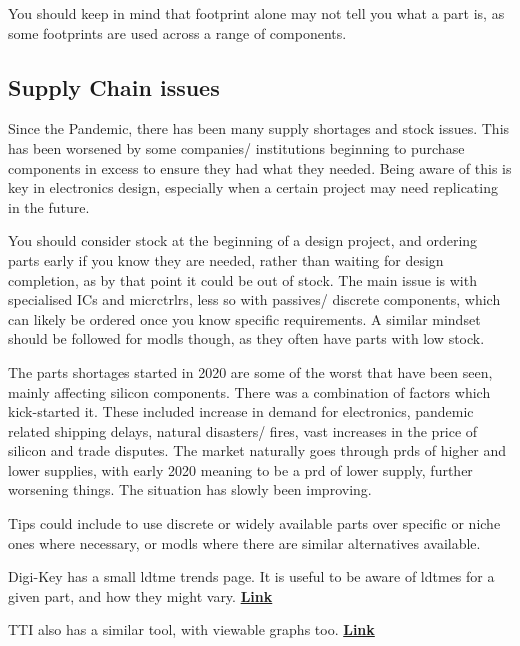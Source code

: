 \documentclass[a4paper,11pt]{report}
\let\oldhref\href %
\renewcommand{\href}[2]{\oldhref{#1}{\bfseries#2}}
\begin{document}
You should keep in mind that footprint alone may not tell you what a part is, as some footprints are used across a range of components.

\vspace*{1\baselineskip}

\subsection{Supply Chain issues}

Since the Pandemic, there has been many supply shortages and stock issues. This has been worsened by some companies/ institutions beginning to purchase components in excess to ensure they had what they needed. Being aware of this is key in electronics design, especially when a certain project may need replicating in the future.

You should consider stock at the beginning of a design project, and ordering parts early if you know they are needed, rather than waiting for design completion, as by that point it could be out of stock. The main issue is with specialised ICs and \gls{micrctrlr}s, less so with passives/ discrete components, which can likely be ordered once you know specific requirements. A similar mindset should be followed for \gls{modl}s though, as they often have parts with low stock.

The parts shortages started in 2020 are some of the worst that have been seen, mainly affecting silicon components. There was a combination of factors which kick-started it. These included increase in demand for electronics, pandemic related shipping delays, natural disasters/ fires, vast increases in the price of silicon and trade disputes. The market naturally goes through \gls{prd}s of higher and lower supplies, with early 2020 meaning to be a \gls{prd} of lower supply, further worsening things. The situation has slowly been improving.

Tips could include to use discrete or widely available parts over specific or niche ones where necessary, or \gls{modl}s where there are similar alternatives available.

Digi-Key has a small \gls{ldtme} trends page. It is useful to be aware of \gls{ldtme}s for a given part, and how they might vary. \href{https://www.digikey.co.uk/en/resources/reports/lead-time-trends}{Link}

TTI also has a similar tool, with viewable graphs too. \href{https://www.tti.com/content/ttiinc/en/apps/lead-time-trends.html}{Link}
\end{document}
